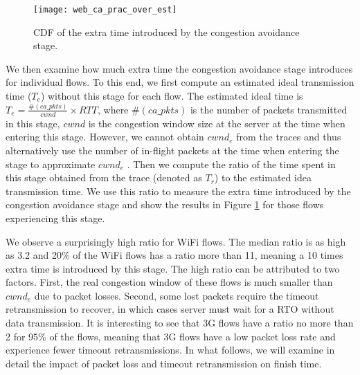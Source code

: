 %

\begin{figure}[th]
\centering
\texttt{[image: web\_ca\_prac\_over\_est]}
\caption{CDF of the extra time introduced by the congestion avoidance stage.}
\label{fig:web_ca_round}
\end{figure}

We then examine how much extra time the congestion avoidance stage introduces for individual flows. To this end, we first compute an estimated ideal transmission time ($T_e$) without this stage for each flow. The estimated ideal time is $T_e = \frac{\#(ca\_pkts)}{cwnd} \times RTT$, where $\#(ca\_pkts)$ is the number of packets transmitted in this stage, $cwnd$ is the congestion window size at the server at the time when entering this stage. However, we cannot obtain $cwnd_e$ from the traces and thus alternatively use the number of in-flight packets at the time when entering the stage to approximate $cwnd_e$ \cite{rfc56812009tcp}. Then we compute the ratio of the time spent in this stage obtained from the trace (denoted as $T_r$) to the estimated idea transmission time. We use this ratio to measure the extra time introduced by the congestion avoidance stage and show the results in Figure \ref{fig:web_ca_round} for those flows experiencing this stage.

We observe a surprisingly high ratio for WiFi flows. The median ratio is as high as 3.2 and 20\% of the WiFi flows has a ratio more than 11, meaning a 10 times extra time is introduced by this stage. The high ratio can be attributed to two factors. First, the real congestion window of these flows is much smaller than $cwnd_e$ due to packet losses. Second, some lost packets require the timeout retransmission to recover, in which cases server must wait for a RTO without data transmission. It is interesting to see that 3G flows have a ratio no more than 2 for 95\% of the flows, meaning that 3G flows have a low packet loss rate and experience fewer timeout retransmissions. In what follows, we will examine in detail the impact of packet loss and timeout retransmission on finish time. 

